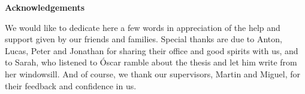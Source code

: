 \begingroup%
\makeatletter%
\cleardoublepage%
\let\newpage\relax%
\let\clearpage\relax%
\vspace*{\fill}%
\vspace*{\dimexpr-50\p@-\baselineskip}%
\begin{center}
\huge \textbf{Acknowledgements}
\end{center}
We would like to dedicate here a few words in appreciation of the help and support given by our friends and families. Special thanks are due to Anton, Lucas, Peter and Jonathan for sharing their office and good spirits with us, and to Sarah, who listened to Óscar ramble about the thesis and let him write from her windowsill. And of course, we thank our supervisors, Martin and Miguel, for their feedback and confidence in us.


\vspace*{\fill}%
\endgroup%



